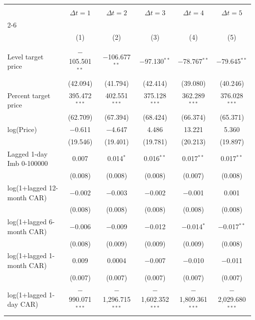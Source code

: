 
\begin{tabular}{@{\extracolsep{5pt}}lccccc} 
\\[-1.8ex]\hline 
\hline \\[-1.8ex] 
 & \multicolumn{1}{c}{\textbf{$\Delta t = 1$}} & \multicolumn{1}{c}{\textbf{$\Delta t = 2$}} & \multicolumn{1}{c}{\textbf{$\Delta t = 3$}} & \multicolumn{1}{c}{\textbf{$\Delta t = 4$}} & \multicolumn{1}{c}{\textbf{$\Delta t = 5$}} \\
\cline{2-6} 
\\[-1.8ex] & (1) & (2) & (3) & (4) & (5)\\ 
\hline \\[-1.8ex] 
 Level target price & $-$105.501$^{**}$ & $-$106.677$^{**}$ & $-$97.130$^{**}$ & $-$78.767$^{**}$ & $-$79.645$^{**}$ \\ 
  & (42.094) & (41.794) & (42.414) & (39.080) & (40.246) \\ 
  Percent target price & 395.472$^{***}$ & 402.551$^{***}$ & 375.128$^{***}$ & 362.289$^{***}$ & 376.028$^{***}$ \\ 
  & (62.709) & (67.394) & (68.424) & (66.374) & (65.371) \\ 
  log(Price) & $-$0.611 & $-$4.647 & 4.486 & 13.221 & 5.360 \\ 
  & (19.546) & (19.401) & (19.781) & (20.213) & (19.897) \\ 
  Lagged 1-day Imb 0-100000 & 0.007 & 0.014$^{*}$ & 0.016$^{**}$ & 0.017$^{**}$ & 0.017$^{**}$ \\ 
  & (0.008) & (0.008) & (0.008) & (0.007) & (0.008) \\ 
  log(1+lagged 12-month CAR) & $-$0.002 & $-$0.003 & $-$0.002 & $-$0.001 & 0.001 \\ 
  & (0.008) & (0.008) & (0.008) & (0.008) & (0.008) \\ 
  log(1+lagged 6-month CAR) & $-$0.006 & $-$0.009 & $-$0.012 & $-$0.014$^{*}$ & $-$0.017$^{**}$ \\ 
  & (0.008) & (0.009) & (0.009) & (0.009) & (0.008) \\ 
  log(1+lagged 1-month CAR) & 0.009 & 0.0004 & $-$0.007 & $-$0.010 & $-$0.011 \\ 
  & (0.007) & (0.007) & (0.007) & (0.007) & (0.007) \\ 
  log(1+lagged 1-day CAR) & $-$990.071$^{***}$ & $-$1,296.715$^{***}$ & $-$1,602.352$^{***}$ & $-$1,809.361$^{***}$ & $-$2,029.680$^{***}$ \\ 

\end{tabular}
